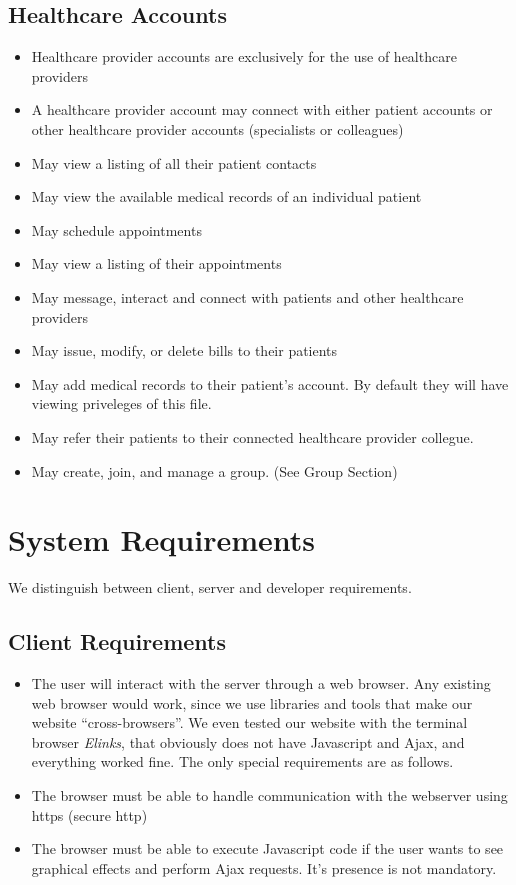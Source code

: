 \section{Healthcare Accounts}
\begin{itemize}
\item Healthcare provider accounts are exclusively for the use of healthcare providers
\item A healthcare provider account may connect with either patient accounts or other healthcare provider accounts (specialists or colleagues)
\item May view a listing of all their patient contacts
\item May view the available medical records of an individual patient
\item May schedule appointments
\item May view a listing of their appointments
\item May message, interact and connect with patients and other healthcare providers
\item May issue, modify, or delete bills to their patients
\item May add medical records to their patient's account. By default they will have viewing priveleges of this file.
\item May refer their patients to their connected healthcare provider collegue.
\item May create, join, and manage a group. (See Group Section)
\end{itemize}



\chapter{System Requirements}
We distinguish between client, server and developer requirements.

\section{Client Requirements}
\begin{itemize}
\item The user will interact with the server through a web browser. Any existing web browser would work, since we use libraries and tools that make our website ``cross-browsers''. We even tested our website with the terminal browser \emph{Elinks}, that obviously does not have Javascript and Ajax, and everything worked fine. The only special requirements are as follows.
\item The browser must be able to handle communication with the webserver using https (secure http)
\item The browser must be able to execute Javascript code if the user wants to see graphical effects and perform Ajax requests. It's presence is not mandatory.
\end{itemize}

